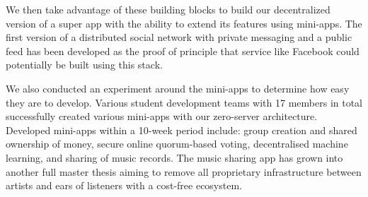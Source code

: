 We then take advantage of these building blocks to build our decentralized version of a super app with the ability to extend its features using mini-apps. The first version of a distributed social network with private messaging and a public feed has been developed as the proof of principle that service like Facebook could potentially be built using this stack.

We also conducted an experiment around the mini-apps to determine how easy they are to develop. Various student development teams with 17 members in total successfully created various mini-apps with our zero-server architecture. Developed mini-apps within a 10-week period include: group creation and shared ownership of money, secure online quorum-based voting, decentralised machine learning, and sharing of music records. The music sharing app has grown into another full master thesis aiming to remove all proprietary infrastructure between artists and ears of listeners with a cost-free ecosystem.

